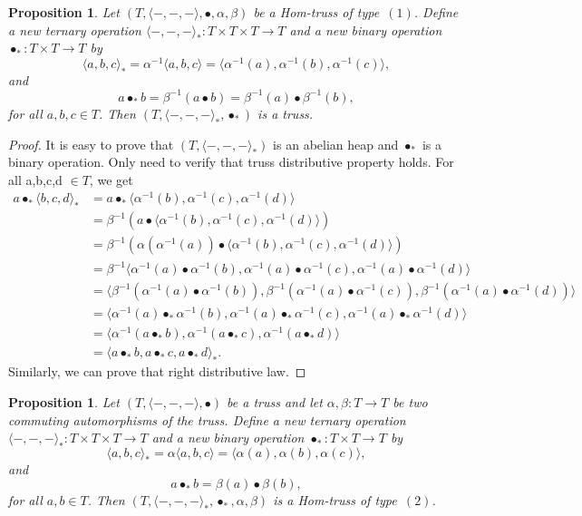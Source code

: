 \documentclass[14pt]{article}
\newtheorem{prop}[thm]{Proposition}
\theoremstyle{Definition}
\theoremstyle{remark}
\begin{document}
\begin{prop}
Let $(T,\langle-,-,-\rangle,\bullet,\alpha,\beta)$ be a Hom-truss of type~$(1)$.  
Define a new ternary operation $\langle-,-,-\rangle_{\ast}:T\times T\times T\rightarrow T$ and a new binary operation $\bullet_{\ast}:T\times T\rightarrow T$ by
\[
\langle a,b,c\rangle_{\ast}=\alpha^{-1}\langle a,b,c\rangle
=\langle\alpha^{-1}(a),\alpha^{-1}(b),\alpha^{-1}(c)\rangle,
\]
and 
\[
a\bullet_{\ast}b=\beta^{-1}(a\bullet b)
=\beta^{-1}(a)\bullet \beta^{-1}(b),
\]
for all $a,b,c\in T$.  
Then $(T,\langle-,-,-\rangle_{\ast},\bullet_{\ast})$ is a truss.
\end{prop}
\begin{proof}
It is easy to prove that $(T,\langle-,-,-\rangle_{\ast})$ is an abelian heap and $\bullet_{\ast}$ is a binary operation. Only need to verify that truss distributive property holds. For all a,b,c,d $\in T$, we get
\begin{align*}
a\bullet_{\ast}\langle b,c,d\rangle_{\ast}&=a\bullet_{\ast}\langle\alpha^{-1}(b),\alpha^{-1}(c),\alpha^{-1}(d)\rangle\\
&=\beta^{-1}(a\bullet \langle\alpha^{-1}(b),\alpha^{-1}(c),\alpha^{-1}(d)\rangle)\\
&=\beta^{-1}(\alpha(\alpha^{-1}(a))\bullet \langle\alpha^{-1}(b),\alpha^{-1}(c),\alpha^{-1}(d)\rangle)\\
&=\beta^{-1}\langle \alpha^{-1}(a)\bullet\alpha^{-1}(b),\alpha^{-1}(a)\bullet\alpha^{-1}(c),\alpha^{-1}(a)\bullet\alpha^{-1}(d)\rangle\\
&=\langle\beta^{-1}( \alpha^{-1}(a)\bullet\alpha^{-1}(b)),\beta^{-1}(\alpha^{-1}(a)\bullet\alpha^{-1}(c)),\beta^{-1}(\alpha^{-1}(a)\bullet\alpha^{-1}(d))\rangle\\
&=\langle \alpha^{-1}(a)\bullet_{\ast}\alpha^{-1}(b),\alpha^{-1}(a)\bullet_{\ast}\alpha^{-1}(c),\alpha^{-1}(a)\bullet_{\ast}\alpha^{-1}(d)\rangle\\
&=\langle \alpha^{-1}(a\bullet_{\ast}b),\alpha^{-1}(a\bullet_{\ast}c),\alpha^{-1}(a\bullet_{\ast}d)\rangle\\
&=\langle a\bullet_{\ast}b,a\bullet_{\ast}c,a\bullet_{\ast}d\rangle_\ast.
\end{align*}
Similarly, we can prove that right distributive law.
\end{proof}
\begin{prop}
Let $(T,\langle-,-,-\rangle,\bullet)$ be a truss and let $\alpha,\beta: T\rightarrow T$ be two commuting automorphisms of the truss.  
Define a new ternary operation $\langle-,-,-\rangle_{\ast}:T\times T\times T\rightarrow T$ and a new binary operation $\bullet_{\ast}:T\times T\rightarrow T$ by
\[
\langle a,b,c\rangle_{\ast}=\alpha\langle a,b,c\rangle
=\langle\alpha(a),\alpha(b),\alpha(c)\rangle,
\]
and
\[
a\bullet_{\ast}b=\beta(a)\bullet\beta(b),
\]
for all $a,b\in T$.  
Then $(T,\langle-,-,-\rangle_{\ast},\bullet_{\ast},\alpha,\beta)$ is a Hom-truss of type~$(2)$.
\end{prop}
\end{document}

